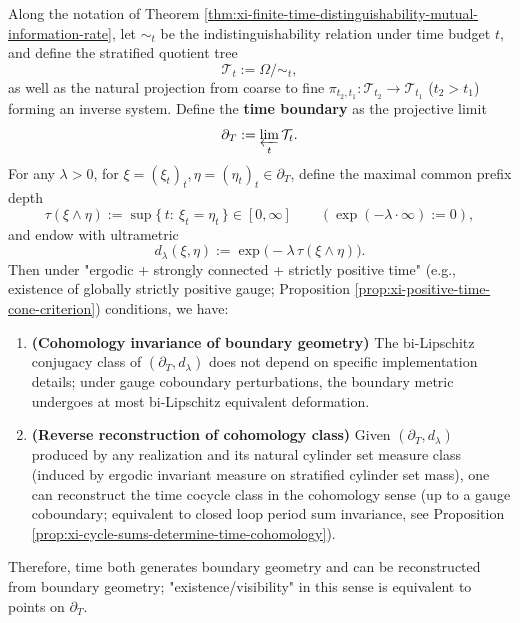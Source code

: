 \begin{theorem}\label{thm:xi-time-boundary-double-reconstruction}
Along the notation of Theorem \ref{thm:xi-finite-time-distinguishability-mutual-information-rate}, let \(\sim_t\) be the indistinguishability relation under time budget \(t\), and define the stratified quotient tree
\[
\mathcal T_t:=\Omega/\!\sim_t,
\]
as well as the natural projection from coarse to fine \(\pi_{t_2,t_1}:\mathcal T_{t_2}\to \mathcal T_{t_1}\) (\(t_2>t_1\)) forming an inverse system.
Define the \textbf{time boundary} as the projective limit
\[
\partial_T:=\varprojlim_{t}\mathcal T_t.
\]
For any \(\lambda>0\), for \(\xi=(\xi_t)_t,\eta=(\eta_t)_t\in\partial_T\), define the maximal common prefix depth
\[
\tau(\xi\wedge\eta):=\sup\{\,t:\ \xi_t=\eta_t\,\}\in[0,\infty]\qquad(\exp(-\lambda\cdot\infty):=0),
\]
and endow with ultrametric
\[
d_\lambda(\xi,\eta):=\exp\bigl(-\lambda\,\tau(\xi\wedge\eta)\bigr).
\]
Then under "ergodic + strongly connected + strictly positive time" (e.g., existence of globally strictly positive gauge; Proposition \ref{prop:xi-positive-time-cone-criterion}) conditions, we have:
\begin{enumerate}
  \item \textbf{(Cohomology invariance of boundary geometry)} The bi-Lipschitz conjugacy class of \((\partial_T,d_\lambda)\) does not depend on specific implementation details; under gauge coboundary perturbations, the boundary metric undergoes at most bi-Lipschitz equivalent deformation.
  \item \textbf{(Reverse reconstruction of cohomology class)} Given \((\partial_T,d_\lambda)\) produced by any realization and its natural cylinder set measure class (induced by ergodic invariant measure on stratified cylinder set mass), one can reconstruct the time cocycle class in the cohomology sense (up to a gauge coboundary; equivalent to closed loop period sum invariance, see Proposition \ref{prop:xi-cycle-sums-determine-time-cohomology}).
\end{enumerate}
Therefore, time both generates boundary geometry and can be reconstructed from boundary geometry; "existence/visibility" in this sense is equivalent to points on \(\partial_T\).
\end{theorem}
